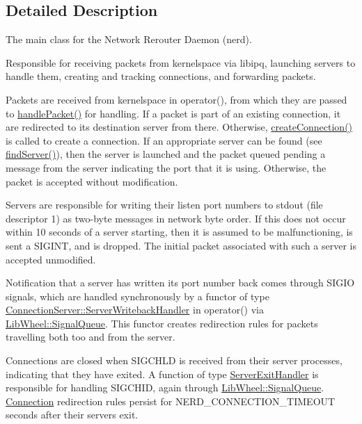 \subsection{\-Detailed \-Description}
\-The main class for the \-Network \-Rerouter \-Daemon (nerd). 

\-Responsible for receiving packets from kernelspace via libipq, launching servers to handle them, creating and tracking connections, and forwarding packets.

\-Packets are received from kernelspace in operator(), from which they are passed to \hyperlink{classNERD_1_1ConnectionServer_a5b183a39539b07fe4a92ef3ad88d7c92}{handle\-Packet()} for handling. \-If a packet is part of an existing connection, it are redirected to its destination server from there. \-Otherwise, \hyperlink{classNERD_1_1ConnectionServer_af4ba681fed213914c83661a1dfd8df6d}{create\-Connection()} is called to create a connection. \-If an appropriate server can be found (see \hyperlink{classNERD_1_1ConnectionServer_a9d75b0d048d374095c4d7c96e4add7f8}{find\-Server()}), then the server is launched and the packet queued pending a message from the server indicating the port that it is using. \-Otherwise, the packet is accepted without modification.

\-Servers are responsible for writing their listen port numbers to stdout (file descriptor 1) as two-\/byte messages in network byte order. \-If this does not occur within 10 seconds of a server starting, then it is assumed to be malfunctioning, is sent a \-S\-I\-G\-I\-N\-T, and is dropped. \-The initial packet associated with such a server is accepted unmodified.

\-Notification that a server has written its port number back comes through \-S\-I\-G\-I\-O signals, which are handled synchronously by a functor of type \hyperlink{classNERD_1_1ConnectionServer_1_1ServerWritebackHandler}{\-Connection\-Server\-::\-Server\-Writeback\-Handler} in operator() via \hyperlink{classLibWheel_1_1SignalQueue}{\-Lib\-Wheel\-::\-Signal\-Queue}. \-This functor creates redirection rules for packets travelling both too and from the server.

\-Connections are closed when \-S\-I\-G\-C\-H\-L\-D is received from their server processes, indicating that they have exited. \-A function of type \hyperlink{classNERD_1_1ConnectionServer_1_1ServerExitHandler}{\-Server\-Exit\-Handler} is responsible for handling \-S\-I\-G\-C\-H\-I\-D, again through \hyperlink{classLibWheel_1_1SignalQueue}{\-Lib\-Wheel\-::\-Signal\-Queue}. \hyperlink{classNERD_1_1ConnectionServer_1_1Connection}{\-Connection} redirection rules persist for {\ttfamily \-N\-E\-R\-D\-\_\-\-C\-O\-N\-N\-E\-C\-T\-I\-O\-N\-\_\-\-T\-I\-M\-E\-O\-U\-T} seconds after their servers exit.

